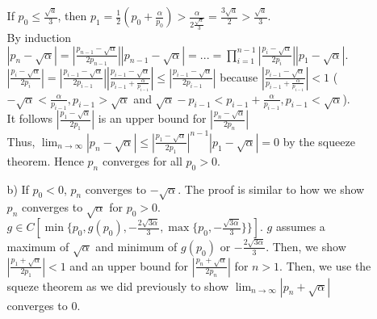 \documentclass[12pt]{article}
\begin{document}
\begin{enumerate}[label=\bfseries Problem \arabic*:]
\begin{itemize}
        If $p_0\le\frac{\sqrt{a}}{3}$, then $p_1=\frac{1}{2}(p_0+\frac{\alpha}{p_0})>\frac{\alpha}{2\frac{\sqrt{a}}{3}}=\frac{3\sqrt{a}}{2}>\frac{\sqrt{a}}{3}$.\\
        By induction $|p_n-\sqrt{\alpha}|=|\frac{p_{n-1}-\sqrt{\alpha}}{2p_{n-1}}||p_{n-1}-\sqrt{\alpha}|=...=\prod_{i=1}^{n-1}|\frac{p_{i}-\sqrt{\alpha}}{2p_{i}}||p_1-\sqrt{\alpha}|$.
        $|\frac{p_{i}-\sqrt{\alpha}}{2p_{i}}|=|\frac{p_{i-1}-\sqrt{\alpha}}{2p_{i-1}}||\frac{p_{i-1}-\sqrt{\alpha}}{p_{i-1}+\frac{\alpha}{p_{i-1}}}|\le|\frac{p_{i-1}-\sqrt{\alpha}}{2p_{i-1}}|$ because $|\frac{p_{i-1}-\sqrt{\alpha}}{p_{i-1}+\frac{\alpha}{p_{i-1}}}|<1$ ($-\sqrt{\alpha}<\frac{\alpha}{p_{i-1}},p_{i-1}>\sqrt{\alpha}$ and $\sqrt{\alpha}-p_{i-1}<p_{i-1}+\frac{\alpha}{p_{i-1}},p_{i-1}<\sqrt{\alpha}$).\\
        It follows $|\frac{p_1-\sqrt{\alpha}}{2p_1}|$ is an upper bound for $|\frac{p_n-\sqrt{\alpha}}{2p_n}|$\\
        Thus, $\displaystyle{\lim_{n\rightarrow\infty}}|p_n-\sqrt{\alpha}|\le|\frac{p_1-\sqrt{\alpha}}{2p_1}|^{n-1}|p_1-\sqrt{\alpha}|=0$ by the squeeze theorem. Hence $p_n$ converges for all $p_0>0$.
        \item [b)] If $p_0<0$, $p_n$ converges to $-\sqrt{\alpha}$. The proof is similar to how we show $p_n$ converges to $\sqrt{\alpha}$ for $p_0>0$. $g\in C[\min\{p_0,g(p_0),-\frac{2\sqrt{3\alpha}}{3},\max\{p_0,-\frac{\sqrt{3\alpha}}{3}\}\}]$. $g$ assumes a maximum of $\sqrt{\alpha}$ and minimum of $g(p_0)$ or $-\frac{2\sqrt{3\alpha}}{3}$. 
        Then, we show $|\frac{p_1+\sqrt{\alpha}}{2p_1}|<1$ and an upper bound for $|\frac{p_n+\sqrt{\alpha}}{2p_n}|$ for $n>1$.
        Then, we use the squeze theorem as we did previously to show $\displaystyle{\lim_{n\rightarrow\infty}}|p_n+\sqrt{\alpha}|$ converges to $0$.
    \end{itemize}
\end{enumerate}
\end{document}
